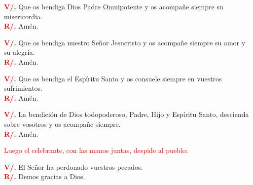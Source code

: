 \documentclass[12pt, letterpaper]{report}
\begin{document}
\noindent
\Large {\bfseries \textcolor{red}{V/.}} \hspace{0.5cm} Que os bendiga Dios Padre Omnipotente y os acompa\~ne siempre su misericordia.\\
\noindent
\Large {\bfseries \textcolor{red}{R/.}} \hspace{0.5cm} Am\'en.

\noindent
\Large {\bfseries \textcolor{red}{V/.}} \hspace{0.5cm} Que os bendiga nuestro Se\~nor Jesucristo y os acompa\~ne siempre su amor y su alegr\'ia.\\
\noindent
\Large {\bfseries \textcolor{red}{R/.}} \hspace{0.5cm} Am\'en.

\noindent
\Large {\bfseries \textcolor{red}{V/.}} \hspace{0.5cm} Que os bendiga el Esp\'iritu Santo y os consuele siempre en vuestros sufrimientos.\\
\noindent
\Large {\bfseries \textcolor{red}{R/.}} \hspace{0.5cm} Am\'en.

\noindent
\Large {\bfseries \textcolor{red}{V/.}} \hspace{0.5cm} La bendici\'on de Dios todopoderoso, Padre, Hijo \Huge{\textcolor{red}{}} \Large y Esp\'iritu Santo, descienda sobre vosotros y os acompa\~ne siempre.\\
\noindent
\Large {\bfseries \textcolor{red}{R/.}} \hspace{0.5cm} Am\'en.

\large{\textcolor{red}{Luego el celebrante, con las manos juntas, despide al pueblo:}}

\noindent
\Large {\bfseries \textcolor{red}{V/.}} \hspace{0.5cm} El Se\~nor ha perdonado vuestros pecados.\\
\noindent
\Large {\bfseries \textcolor{red}{R/.}} \hspace{0.5cm} Demos gracias a Dios.


\end{document}

